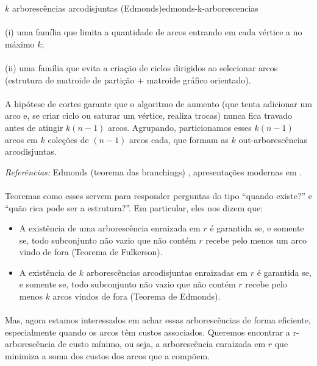 \documentclass[12pt,a4paper]{article}
\begin{document}
\begin{teobox}{$k$ arborescências arcodisjuntas (Edmonds)}{edmonds-k-arborescencias}
\paragraph{}
(i) uma família que limita a quantidade de arcos entrando em cada vértice a no máximo $k$; 

\paragraph{}
(ii) uma família que evita a criação de ciclos dirigidos ao selecionar arcos (estrutura de matroide de partição + matroide gráfico orientado). 

\paragraph{}
A hipótese de cortes garante que o algoritmo de aumento (que tenta adicionar um arco e, se criar ciclo ou saturar um vértice, realiza trocas) nunca fica travado antes de atingir $k(n-1)$ arcos. Agrupando, particionamos esses $k(n-1)$ arcos em $k$ coleções de $(n-1)$ arcos cada, que formam as $k$ out-arborescências arcodisjuntas.

\medskip
\emph{Referências:} Edmonds (teorema das branchings) \cite{edmonds1967optimum}, apresentações modernas em \cite{schrijver2003comb}.
\label{thm:edmonds-disjoint-arborescencias} 
\end{teobox}

\paragraph{}
Teoremas como esses servem para responder perguntas do tipo “quando existe?” e “quão rica pode ser a estrutura?”. Em particular, eles nos dizem que:
\begin{itemize}\setlength{\itemsep}{2pt}
    \item A existência de uma arborescência enraizada em \(r\) é garantida se, e somente se, todo subconjunto não vazio que não contém \(r\) recebe pelo menos um arco vindo de fora (Teorema de Fulkerson).
    \item A existência de \(k\) arborescências arcodisjuntas enraizadas em \(r\) é garantida se, e somente se, todo subconjunto não vazio que não contém \(r\) recebe pelo menos \(k\) arcos vindos de fora (Teorema de Edmonds).
\end{itemize}

\paragraph{}
Mas, agora estamos interessados em achar essas arborescências de forma eficiente, especialmente quando os arcos têm custos associados. Queremos encontrar a r-arborescência de custo mínimo, ou seja, a arborescência enraizada em \(r\) que minimiza a soma dos custos dos arcos que a compõem.
\end{document}
